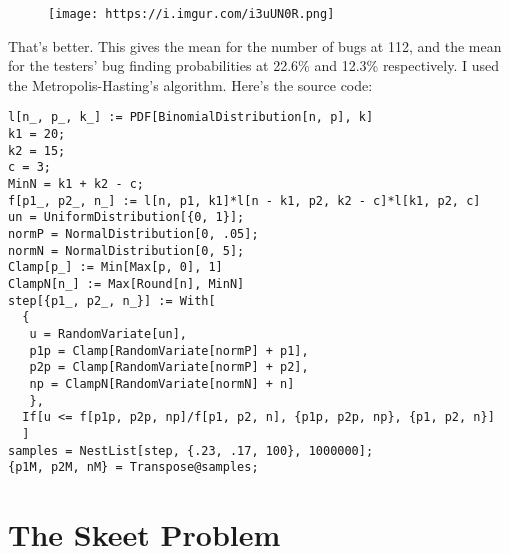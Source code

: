 \documentclass[11pt]{article}
\makeatletter
\def\maxwidth{\ifdim\Gin@nat@width>\linewidth\linewidth
    \else\Gin@nat@width\fi}
\let\Oldincludegraphics\includegraphics
\renewcommand{\includegraphics}[1]{\Oldincludegraphics[width=.8\maxwidth]{#1}}
\makeatother
\begin{document}
\begin{figure}
\centering
\texttt{[image: https://i.imgur.com/i3uUN0R.png]}
\caption{}
\end{figure}

That's better. This gives the mean for the number of bugs at 112, and
the mean for the testers' bug finding probabilities at 22.6\% and 12.3\%
respectively. I used the Metropolis-Hasting's algorithm. Here's the
source code:

\begin{verbatim}
l[n_, p_, k_] := PDF[BinomialDistribution[n, p], k]
k1 = 20;
k2 = 15;
c = 3;
MinN = k1 + k2 - c;
f[p1_, p2_, n_] := l[n, p1, k1]*l[n - k1, p2, k2 - c]*l[k1, p2, c]
un = UniformDistribution[{0, 1}];
normP = NormalDistribution[0, .05];
normN = NormalDistribution[0, 5];
Clamp[p_] := Min[Max[p, 0], 1]
ClampN[n_] := Max[Round[n], MinN]
step[{p1_, p2_, n_}] := With[
  {
   u = RandomVariate[un],
   p1p = Clamp[RandomVariate[normP] + p1],
   p2p = Clamp[RandomVariate[normP] + p2],
   np = ClampN[RandomVariate[normN] + n]
   },
  If[u <= f[p1p, p2p, np]/f[p1, p2, n], {p1p, p2p, np}, {p1, p2, n}]
  ]
samples = NestList[step, {.23, .17, 100}, 1000000];
{p1M, p2M, nM} = Transpose@samples;
\end{verbatim}

    \section{The Skeet Problem}\label{the-skeet-problem}
\end{document}

